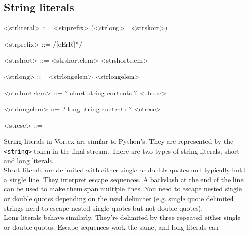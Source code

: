 \documentclass{article}
\newenvironment{bnf}
{
\begin{mdframed}
\begin{grammar}
}
{
\end{grammar}
\end{mdframed}
}
\begin{document}
\subsection{String literals}
\begin{bnf}
<strliteral> ::= <strprefix> (<strlong> | <strshort>)

<strprefix> ::= /[eErR]*/

<strshort> ::= \lit{\textquotedbl} <strshortelem> \lit{\textquotedbl}
    \alt \lit{\textquotesingle} <strshortelem> \lit{\textquotesingle}

<strlong> ::= \lit{\textquotedbl\textquotedbl\textquotedbl} <strlongelem>
        \lit{\textquotedbl\textquotedbl\textquotedbl}
    \alt \lit{\textquotesingle\textquotesingle\textquotesingle} <strlongelem>
        \lit{\textquotesingle\textquotesingle\textquotesingle}

<strshortelem> ::= ? short string contents ?
    \alt <stresc>

<strlongelem> ::= ? long string contents ?
    \alt <stresc>

<stresc> ::= \lit{\\a}
    \alt \lit{\\b}
    \alt \lit{\\f}
    \alt \lit{\\n}
    \alt \lit{\\r}
    \alt \lit{\\t}
    \alt \lit{\\v}
    \alt \lit{\\z}
    \alt \lit{\\\textquotedbl}
    \alt \lit{\\\textquotesingle}
    \alt \lit{\\}
\end{bnf}
String literals in Vortex are similar to Python's. They are represented by the
\verb|<string>| token in the final stream. There are two types of string
literals, short and long literals.\\
Short literals are delimited with either single or double quotes and
typically hold a single line. They interpret escape sequences. A backslash at
the end of the line can be used to make them span multiple lines. You need to
escape nested single or double quotes depending on the used delimiter (e.g.
single quote delimited strings need to escape nested single quotes but
not double quotes).\\
Long literals behave similarly. They're delimited by three repeated either
single or double quotes. Escape sequences work the same, and long literals can
\end{document}
